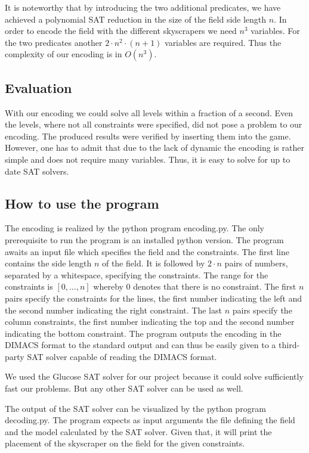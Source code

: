 \documentclass[a4paper, 12pt, titlepage]{article}
\begin{document}
It is noteworthy that by introducing the two additional predicates, we have achieved a polynomial SAT reduction in the size of the field side length $n$. In order to encode the field with the different skyscrapers we need $n^3$ variables. For the two predicates another $2\cdot n^2\cdot(n+1)$ variables are required. Thus the complexity of our encoding is in $O(n^3)$.

\subsection{Evaluation}

With our encoding we could solve all levels within a fraction of a second. Even the levels, where not all constraints were specified, did not pose a problem to our encoding. The produced results were verified by inserting them into the game. However, one has to admit that due to the lack of dynamic the encoding is rather simple and does not require many variables. Thus, it is easy to solve for up to date SAT solvers.

\subsection{How to use the program}
The encoding is realized by the python program encoding.py. The only prerequisite to run the program is an installed python version. The program awaits an input file which specifies the field and the constraints. The first line contains the side length $n$ of the field. It is followed by $2\cdot n$ pairs of numbers, separated by a whitespace, specifying the constraints. The range for the constraints is $[0,\ldots,n]$ whereby $0$ denotes that there is no constraint. The first $n$ pairs specify the constraints for the lines, the first number indicating the left and the second number indicating the right constraint. The last $n$ pairs specify the column constraints, the first number indicating the top and the second number indicating the bottom constraint. The program outputs the encoding in the DIMACS format to the standard output and can thus be easily given to a third-party SAT solver capable of reading the DIMACS format.

We used the Glucose SAT solver for our project because it could solve sufficiently fast our problems. But any other SAT solver can be used as well.

The output of the SAT solver can be visualized by the python program decoding.py. The program expects as input arguments the file defining the field and the model calculated by the SAT solver. Given that, it will print the placement of the skyscraper on the field for the given constraints.
\end{document}
